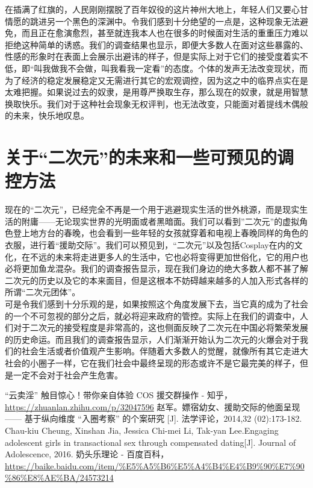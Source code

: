 \documentclass[a4paper]{article}
\begin{document}
	在插满了红旗的，人民刚刚摆脱了百年奴役的这片神州大地上，年轻人们又要心甘情愿的跳进另一个黑色的深渊中。令我们感到十分绝望的一点是，这种现象无法避免，而且正在愈演愈烈，甚至就连我本人也在很多的时候面对生活的重重压力难以拒绝这种简单的诱惑。我们的调查结果也显示，即便大多数人在面对这些暴露的、性感的形象时在表面上会展示出避讳的样子，但是实际上对于它们的接受度着实不低，即“叫我做我不会做，叫我看我一定看”的态度。个体的发声无法改变现状，而为了经济的稳定发展稳定又无需进行其它的宏观调控，因为这之中的临界点实在是太难把握。如果说过去的奴隶，是用尊严换取生存，那么现在的奴隶，就是用智慧换取快乐。我们对于这种社会现象无权评判，也无法改变，只能面对着提线木偶般的未来，快乐地叹息。
	
	
	\clearpage
	\section{关于“二次元”的未来和一些可预见的调控方法}
	现在的“二次元”，已经完全不再是一个用于逃避现实生活的世外桃源，而是现实生活的附庸——无论现实世界的光明面或者黑暗面。我们可以看到”二次元”的虚拟角色登上地方台的春晚，也会看到一些年轻的女孩就穿着和电视上春晚同样的角色的衣服，进行着“援助交际”。我们可以预见到，“二次元”以及包括Cosplay在内的文化，在不远的未来将走进更多人的生活中，它也必将变得更加世俗化，它的用户也必将更加鱼龙混杂。我们的调查报告显示，现在我们身边的绝大多数人都不甚了解二次元的历史以及它的本来面目，但是这根本不妨碍越来越多的人加入形式各样的所谓“二次元团体”。\\
	
	可是令我们感到十分乐观的是，如果按照这个角度发展下去，当它真的成为了社会的一个不可忽视的部分之后，就必将迎来政府的管控。实际上在我们的调查中，人们对于二次元的接受程度是非常高的，这也侧面反映了二次元在中国必将繁荣发展的历史命运。而且我们的调查报告显示，人们渐渐开始认为二次元的火爆会对于我们的社会生活或者价值观产生影响。伴随着大多数人的觉醒，就像所有其它走进大社会的小圈子一样，它在我们社会中最终呈现的形态或许不是它最完美的样子，但是一定不会对于社会产生危害。
	\vskip40pt
	\begin{thebibliography}{4}
		 “云卖淫” 触目惊心！带你亲自体验 COS 援交群操作 - 知乎， \url{https://zhuanlan.zhihu.com/p/32047596}
		 赵军。嫖宿幼女、援助交际的他面呈现 —— 基于纵向维度 “入圈考察” 的个案研究 [J]. 法学评论，2014,32 (02):173-182.
		 Chau-kiu Cheung, Xinshan Jia, Jessica Chi-mei Li, Tak-yan Lee.Engaging adolescent girls in transactional sex through compensated dating[J]. Journal of Adolescence, 2016.
		 奶头乐理论 - 百度百科， \url{https://baike.baidu.com/item/\%E5\%A5\%B6\%E5\%A4\%B4\%E4\%B9\%90\%E7\%90\%86\%E8\%AE\%BA/24573214}
	\end{thebibliography}
\end{document}
